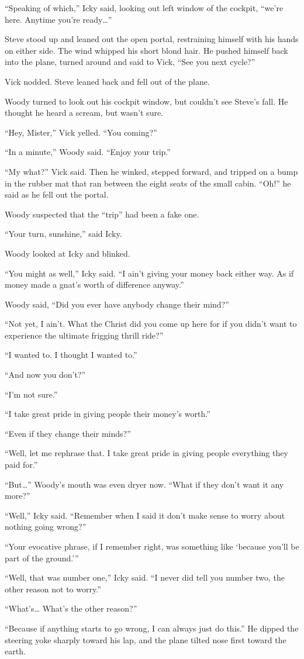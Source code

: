 “Speaking of which,” Icky said, looking out left window of the cockpit, “we’re here. Anytime you’re ready…”

Steve stood up and leaned out the open portal, restraining himself with his hands on either side. The wind whipped his short blond hair. He pushed himself back into the plane, turned around and said to Vick, “See you next cycle?”

Vick nodded. Steve leaned back and fell out of the plane.

Woody turned to look out his cockpit window, but couldn’t see Steve’s fall. He thought he heard a scream, but wasn’t sure.

“Hey, Mister,” Vick yelled. “You coming?”

“In a minute,” Woody said. “Enjoy your trip.”

“My what?” Vick said. Then he winked, stepped forward, and tripped on a bump in the rubber mat that ran between the eight seats of the small cabin. “Oh!” he said as he fell out the portal.

Woody suspected that the “trip” had been a fake one.

“Your turn, sunshine,” said Icky.

Woody looked at Icky and blinked.

“You might as well,” Icky said. “I ain’t giving your money back either way. As if money made a gnat’s worth of difference anyway.”

Woody said, “Did you ever have anybody change their mind?”

“Not yet, I ain’t. What the Christ did you come up here for if you didn’t want to experience the ultimate frigging thrill ride?”

“I wanted to. I thought I wanted to.”

“And now you don’t?”

“I’m not sure.”

“I take great pride in giving people their money’s worth.”

“Even if they change their minds?”

“Well, let me rephrase that. I take great pride in giving people everything they paid for.”

“But…” Woody’s mouth was even dryer now. “What if they don’t want it any more?”

“Well,” Icky said. “Remember when I said it don’t make sense to worry about nothing going wrong?”

“Your evocative phrase, if I remember right, was something like ‘because you’ll be part of the ground.’\thinspace”

“Well, that was number one,” Icky said. “I never did tell you number two, the other reason not to worry.”

“What’s… What’s the other reason?”

“Because if anything starts to go wrong, I can always just do this.” He dipped the steering yoke sharply toward his lap, and the plane tilted nose first toward the earth.
